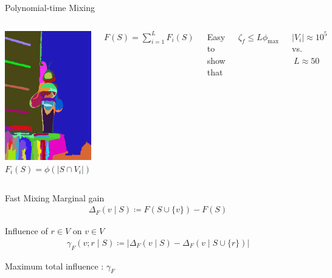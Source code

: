 \documentclass[mathserif]{beamer}
\newcommand{\qboxa}[1]{%
\begin{tcolorbox}[enhanced jigsaw,size=tight,hbox,boxsep=4pt,boxrule=1pt,coltext=textcolor,colframe=col1,opacityback=0,opacityframe=1]
\strut #1
\end{tcolorbox}%
}
\begin{document}
\begin{frame}{Polynomial-time Mixing}
\vspace{0.5em}
\begin{columns}[c]
\centering
\includegraphics[width=1.8in]{figures/bee_superpixels.png}
$F_i(S) = \phi\left(|S \cap V_i|\right)$

\vspace{1em}
$F(S) = \displaystyle\sum_{i=1}^L F_i(S)$

\vspace{3em}
Easy to show that

\vspace{0.5em}
\hspace{2em}$\zeta_f \leq L \phi_{\textrm{max}}$

\vspace{3em}
\qboxa{
$|V_i| \approx 10^5\ $ vs. $\ L \approx 50$
}
\end{columns}
\end{frame}

\begin{frame}{Fast Mixing}
Marginal gain
\begin{align*}
\Delta_F(v \mid S) \coloneqq F(S \cup \{v\}) - F(S)
\end{align*}

\vspace{1em}
Influence of $r \in V$ on $v \in V$
\begin{align*}
\gamma_F(v; r \mid S) \coloneqq \big|\Delta_F(v \mid S) - \Delta_F(v \mid S \cup \{r\})\big|
\end{align*}

\vspace{1em}
Maximum total influence :\hspace{0.5em} $\gamma_F$
\end{frame}
\end{document}
